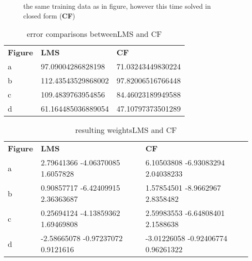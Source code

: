 \begin{figure}[!h]
\begin{center}
\centering
{}
\end{center}
\caption{\label{fig:cf}the same training data as in figure, however this time solved in closed form (\textbf{CF}) }
\end{figure}


\begin{table}[!h]
\begin{tabular}{lll}
\textbf{Figure} & \textbf{LMS} & \textbf{CF} \\
a               &       97.09004286828198       &     71.03243449830224       \\
b               &      112.43543529868002        &     97.82006516766448          \\
c               &        109.4839763954856      &        84.46023189949588         \\
d               &        61.164485036889054      &         47.10797373501289        \\
\end{tabular}
\caption{\label{tab:error} error comparisons between{LMS} and {CF}}
\end{table}

\begin{table}[]
\begin{tabular}{lll}
\textbf{Figure} & \textbf{LMS} & \textbf{CF} \\
a               &        2.79641366 -4.06370085  1.6057828       &     6.10503808 -6.93083294  2.04038233       \\
b               &      0.90857717 -6.42409915  2.36363687        &     1.57854501 -8.9662967   2.8358482          \\
c               &        0.25694124 -4.13859362  1.69469808      &        2.59983553 -6.64808401  2.1588638         \\
d               &        -2.58665078 -0.97237072  0.9121616       &         -3.01226058 -0.92406774  0.96261322        \\
\end{tabular}
\caption{\label{tab:weights}resulting weights{LMS} and {CF}}
\end{table}



